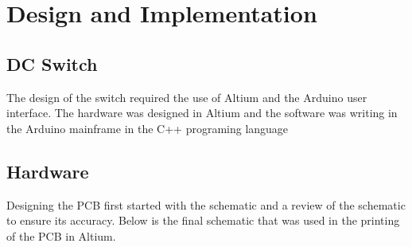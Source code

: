 \section{Design and Implementation}

\subsection{DC Switch}

The design of the switch required the use of Altium and the Arduino user interface. The hardware was designed in Altium and the software was writing in the Arduino mainframe in the C++ programing language 

\subsection{Hardware}

Designing the PCB first started with the schematic and a review of the schematic to ensure its accuracy. Below is the final schematic that was used in the printing of the PCB in Altium.









